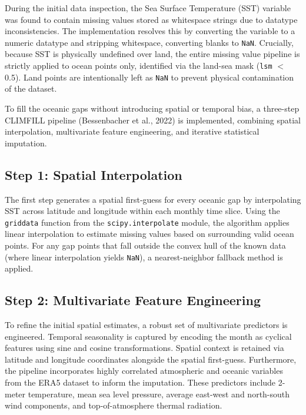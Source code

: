 During the initial data inspection, the Sea Surface Temperature (SST) variable was found to contain missing values stored as whitespace strings due to datatype inconsistencies. The implementation resolves this by converting the variable to a numeric datatype and stripping whitespace, converting blanks to \texttt{NaN}. Crucially, because SST is physically undefined over land, the entire missing value pipeline is strictly applied to ocean points only, identified via the land-sea mask (\texttt{lsm} $<$ 0.5). Land points are intentionally left as \texttt{NaN} to prevent physical contamination of the dataset.

To fill the oceanic gaps without introducing spatial or temporal bias, a three-step CLIM\allowbreak FILL pipeline (Bessenbacher et al., 2022) is implemented, combining spatial interpolation, multivariate feature engineering, and iterative statistical imputation.

\subsection{Step 1: Spatial Interpolation}
The first step generates a spatial first-guess for every oceanic gap by interpolating SST across latitude and longitude within each monthly time slice. Using the \texttt{griddata} function from the \texttt{scipy.\allowbreak interpolate} module, the algorithm applies linear interpolation to estimate missing values based on surrounding valid ocean points. For any gap points that fall outside the convex hull of the known data (where linear interpolation yields \texttt{NaN}), a nearest-neighbor fallback method is applied.

\subsection{Step 2: Multivariate Feature Engineering}
To refine the initial spatial estimates, a robust set of multivariate predictors is engineered. Temporal seasonality is captured by encoding the month as cyclical features using sine and cosine transformations. Spatial context is retained via latitude and longitude coordinates alongside the spatial first-guess. Furthermore, the pipeline incorporates highly correlated atmospheric and oceanic variables from the ERA5 dataset to inform the imputation. These predictors include 2-meter temperature, mean sea level pressure, average east-west and north-south wind components, and top-of-atmosphere thermal radiation.

